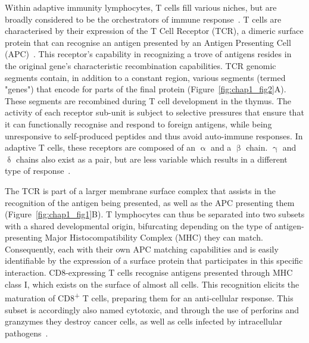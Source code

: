 Within adaptive immunity lymphocytes, T cells fill various niches, but are broadly considered to be the orchestrators of immune response~\citep{kumar_human_2018}. T cells are characterised by their expression of the T Cell Receptor (TCR), a dimeric surface protein that can recognise an antigen presented by an Antigen Presenting Cell (APC)~\citep{reinherz_revisiting_2014}. This receptor's capability in recognizing a trove of antigens resides in the original gene's characteristic recombination capabilities. TCR genomic segments contain, in addition to a constant region, various segments (termed "genes") that encode for parts of the final protein (Figure~\ref{fig:chap1_fig2}A). These segments are recombined during T cell development in the thymus. The activity of each receptor sub-unit is subject to selective pressures that ensure that it can functionally recognise and respond to foreign antigens, while being unresponsive to self-produced peptides and thus avoid auto-immune responses. In adaptive T cells, these receptors are composed of an ${\upalpha}$ and a ${\upbeta}$ chain. ${\upgamma}$ and ${\updelta}$ chains also exist as a pair, but are less variable which results in a different type of response~\citep{simoes_molecular_2018}.

The TCR is part of a larger membrane surface complex that assists in the recognition of the antigen being presented, as well as the APC presenting them (Figure~\ref{fig:chap1_fig1}B). T lymphocytes can thus be separated into two subsets with a shared developmental origin, bifurcating depending on the type of antigen-presenting Major Histocompatibility Complex (MHC) they can match. Consequently, each with their own APC matching capabilities and is easily identifiable by the expression of a surface protein that participates in this specific interaction. CD8-expressing T cells recognise antigens presented through MHC class I, which exists on the surface of almost all cells. This recognition elicits the maturation of CD8\textsuperscript{+} T cells, preparing them for an anti-cellular response. This subset is accordingly also named cytotoxic, and through the use of perforins and granzymes they destroy cancer cells, as well as cells infected by intracellular pathogens~\citep{halle_mechanisms_2017}.


